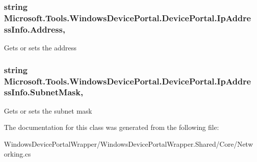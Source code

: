 \subsubsection[{\texorpdfstring{Address}{Address}}]{\setlength{\rightskip}{0pt plus 5cm}string Microsoft.\+Tools.\+Windows\+Device\+Portal.\+Device\+Portal.\+Ip\+Address\+Info.\+Address\hspace{0.3cm}{\ttfamily [get]}, {\ttfamily [set]}}\hypertarget{class_microsoft_1_1_tools_1_1_windows_device_portal_1_1_device_portal_1_1_ip_address_info_a15236608f9b820b20dd163eeb55fceb5}{}\label{class_microsoft_1_1_tools_1_1_windows_device_portal_1_1_device_portal_1_1_ip_address_info_a15236608f9b820b20dd163eeb55fceb5}


Gets or sets the address 

\subsubsection[{\texorpdfstring{Subnet\+Mask}{SubnetMask}}]{\setlength{\rightskip}{0pt plus 5cm}string Microsoft.\+Tools.\+Windows\+Device\+Portal.\+Device\+Portal.\+Ip\+Address\+Info.\+Subnet\+Mask\hspace{0.3cm}{\ttfamily [get]}, {\ttfamily [set]}}\hypertarget{class_microsoft_1_1_tools_1_1_windows_device_portal_1_1_device_portal_1_1_ip_address_info_af4d4bc919dcd543d7835c40880aa8133}{}\label{class_microsoft_1_1_tools_1_1_windows_device_portal_1_1_device_portal_1_1_ip_address_info_af4d4bc919dcd543d7835c40880aa8133}


Gets or sets the subnet mask 



The documentation for this class was generated from the following file\+:\begin{DoxyCompactItemize}
\item 
Windows\+Device\+Portal\+Wrapper/\+Windows\+Device\+Portal\+Wrapper.\+Shared/\+Core/Networking.\+cs\end{DoxyCompactItemize}
